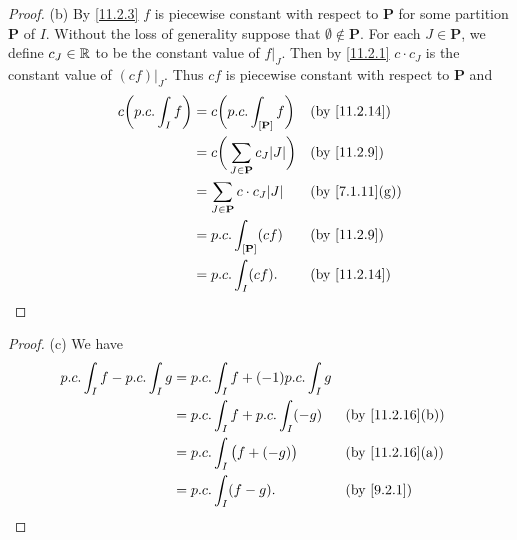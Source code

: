 \begin{proof}{(b)}
  By \cref{11.2.3} \(f\) is piecewise constant with respect to \(\mathbf{P}\) for some partition \(\mathbf{P}\) of \(I\).
  Without the loss of generality suppose that \(\emptyset \notin \mathbf{P}\).
  For each \(J \in \mathbf{P}\), we define \(c_J \in \mathbb{R}\) to be the constant value of \(f|_J\).
  Then by \cref{11.2.1} \(c \cdot c_J\) is the constant value of \((cf)|_J\).
  Thus \(cf\) is piecewise constant with respect to \(\mathbf{P}\) and
  \begin{align*}
    c \bigg(p.c. \int_I f\bigg) & = c \bigg(p.c. \int_{[\mathbf{P}]} f\bigg)          &  & \text{(by \cref{11.2.14})}   \\
                                & = c \bigg(\sum_{J \in \mathbf{P}} c_J \abs{J}\bigg) &  & \text{(by \cref{11.2.9})}    \\
                                & = \sum_{J \in \mathbf{P}} c \cdot c_J \abs{J}       &  & \text{(by \cref{7.1.11}(g))} \\
                                & = p.c. \int_{[\mathbf{P}]} (c f)                    &  & \text{(by \cref{11.2.9})}    \\
                                & = p.c. \int_I (c f).                                &  & \text{(by \cref{11.2.14})}
  \end{align*}
\end{proof}

\begin{proof}{(c)}
  We have
  \begin{align*}
    p.c. \int_I f - p.c. \int_I g & = p.c. \int_I f + (-1) p.c. \int_I g                                    \\
                                  & = p.c. \int_I f + p.c. \int_I (-g)   &  & \text{(by \cref{11.2.16}(b))} \\
                                  & = p.c. \int_I \big(f + (-g)\big)     &  & \text{(by \cref{11.2.16}(a))} \\
                                  & = p.c. \int_I (f - g).               &  & \by{9.2.1}
  \end{align*}
\end{proof}

